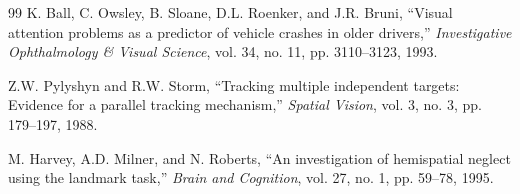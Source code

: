 \documentclass[12pt,a4paper]{report}
\begin{document}
\begin{thebibliography}{99}
K. Ball, C. Owsley, B. Sloane, D.L. Roenker, and J.R. Bruni,
``Visual attention problems as a predictor of vehicle crashes in older drivers,''
\textit{Investigative Ophthalmology \& Visual Science}, vol. 34, no. 11, pp. 3110--3123, 1993.

Z.W. Pylyshyn and R.W. Storm,
``Tracking multiple independent targets: Evidence for a parallel tracking mechanism,''
\textit{Spatial Vision}, vol. 3, no. 3, pp. 179--197, 1988.

M. Harvey, A.D. Milner, and N. Roberts,
``An investigation of hemispatial neglect using the landmark task,''
\textit{Brain and Cognition}, vol. 27, no. 1, pp. 59--78, 1995.

\end{thebibliography}
\endgroup
\end{document}
